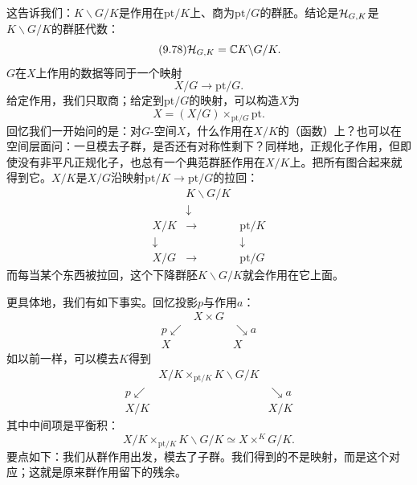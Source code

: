 这告诉我们：$K\backslash G/K$是作用在$\mathrm{pt}/K$上、商为$\mathrm{pt}/G$的群胚。结论是$\mathcal{H}_{G,K}$是$K\backslash G/K$的群胚代数：
\begin{equation}\tag{9.78}
\mathcal{H}_{G,K}=\mathbb{C} K\backslash G/K.
\end{equation}
$G$在$X$上作用的数据等同于一个映射
\begin{equation}\tag{9.79}
X/G\to\mathrm{pt}/G.
\end{equation}
给定作用，我们只取商；给定到$\mathrm{pt}/G$的映射，可以构造$X$为
\begin{equation}\tag{9.80}
X=(X/G)\times_{\mathrm{pt}/G}\mathrm{pt}.
\end{equation}
回忆我们一开始问的是：对$G$-空间$X$，什么作用在$X/K$的（函数）上？也可以在空间层面问：一旦模去子群，是否还有对称性剩下？同样地，正规化子作用，但即使没有非平凡正规化子，也总有一个典范群胚作用在$X/K$上。把所有图合起来就得到它。$X/K$是$X/G$沿映射$\mathrm{pt}/K\to\mathrm{pt}/G$的拉回：
\begin{equation}\tag{9.81}
\begin{array}{ccc}
& K\backslash G/K &\\[-2pt]
& \downarrow &\\[-2pt]
X/K & \longrightarrow & \mathrm{pt}/K\\
\downarrow & & \downarrow\\
X/G & \longrightarrow & \mathrm{pt}/G
\end{array}
\end{equation}
而每当某个东西被拉回，这个下降群胚$K\backslash G/K$就会作用在它上面。

更具体地，我们有如下事实。回忆投影$p$与作用$a$：
\begin{equation}\tag{9.82}
\begin{array}{ccc}
& X\times G &\\[-2pt]
p\swarrow & & \searrow a\\[-2pt]
X & & X
\end{array}
\end{equation}
如以前一样，可以模去$K$得到
\begin{equation}\tag{9.83}
\begin{array}{ccc}
& X/K\times_{\mathrm{pt}/K}K\backslash G/K &\\[-2pt]
p\swarrow & & \searrow a\\[-2pt]
X/K & & X/K
\end{array}
\end{equation}
其中中间项是平衡积：
\begin{equation}\tag{9.84}
X/K\times_{\mathrm{pt}/K}K\backslash G/K\simeq X\times^{K}G/K.
\end{equation}
要点如下：我们从群作用出发，模去了子群。我们得到的不是映射，而是这个对应；这就是原来群作用留下的残余。

